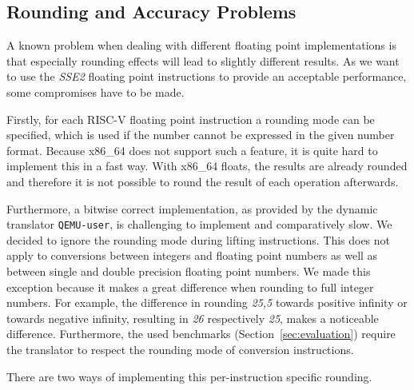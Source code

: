 \documentclass[course=eragp]{aspdoc}
\begin{document}
\subsection{Rounding and Accuracy Problems}

A known problem when dealing with different floating point implementations is that especially
rounding effects will lead to slightly different results. As we want to use the \textit{SSE2} floating point
instructions to provide an acceptable performance, some compromises have to be made.

\par

Firstly, for each RISC-V floating point instruction a rounding mode can be specified, which is used
if the number cannot be expressed in the given number format. Because x86\_64 does not support such a
feature, it is quite hard to implement this in a fast way. With x86\_64 floats, the results are already rounded
and therefore it is not possible to round the result of each operation afterwards.

\par

Furthermore, a bitwise correct implementation, as provided by the dynamic translator
\texttt{QEMU-user}, is
challenging to implement and comparatively slow. We decided to ignore the rounding mode during lifting
instructions. This does not apply to conversions between integers and floating point numbers as well as between single
and double precision floating point numbers. We made this exception because it makes a great difference when
rounding to full integer numbers. For example, the difference in rounding \emph{25,5} towards positive infinity or
towards negative infinity, resulting in \emph{26} respectively \emph{25}, makes a noticeable difference.
Furthermore, the used benchmarks (Section~\ref{sec:evaluation}) require the translator to respect the rounding mode of
conversion instructions.

\par

There are two ways of implementing this per-instruction specific rounding.
\end{document}
